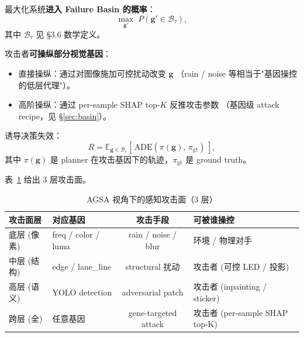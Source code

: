 \documentclass[a4paper,12pt,fontset=fandol]{ctexart}
\begin{document}
\begin{description}[leftmargin=1.4em,style=nextline]
\item[\textbf{敌手目标}（Adversary Goal）] 最大化系统\textbf{进入 Failure Basin 的概率}：
  \begin{equation*}
  \max_{\mathbf{g}'} \; P\!\left(\mathbf{g}' \in \mathcal{B}_{\tau}\right),
  \end{equation*}
  其中 $\mathcal{B}_{\tau}$ 见 §3.6 数学定义。

\item[\textbf{敌手能力}（Adversary Capability）] 攻击者\textbf{可操纵部分视觉基因}：
  \begin{itemize}[leftmargin=*]
  \item 直接操纵：通过对图像施加可控扰动改变 $\mathbf{g}$
    （rain / noise 等相当于"基因操控的低层代理"）。
  \item 高阶操纵：通过 per-sample SHAP top-$K$ 反推攻击参数
    （基因级 attack recipe，见 \S\ref{sec:basin}）。
  \end{itemize}

\item[\textbf{敌手收益}（Adversary Reward）] 诱导决策失效：
  \begin{equation*}
  R = \mathbb{E}_{\mathbf{g} \in \mathcal{B}_{\tau}} \left[\, \mathrm{ADE}\!\left(\pi(\mathbf{g}),\, \pi_{\text{gt}}\right) \,\right],
  \end{equation*}
  其中 $\pi(\mathbf{g})$ 是 planner 在攻击基因下的轨迹，$\pi_{\text{gt}}$ 是 ground truth。

\item[\textbf{攻击面层次}] 表~\ref{tab:attack_surface} 给出 3 层攻击面。
\end{description}

\begin{table}[H]
\centering
\small
\caption{AGSA 视角下的感知攻击面（3 层）}
\label{tab:attack_surface}
\begin{tabularx}{\linewidth}{lXcX}
\toprule
\textbf{攻击面层} & \textbf{对应基因} & \textbf{攻击手段} & \textbf{可被谁操控} \\
\midrule
底层 (像素) & freq / color / luma & rain / noise / blur & 环境 / 物理对手 \\
中层 (结构) & edge / lane\_line & structural 扰动 & 攻击者 (可控 LED / 投影)\\
高层 (语义) & YOLO detection & adversarial patch & 攻击者 (inpainting / sticker)\\
\midrule
跨层 (全) & 任意基因 & gene-targeted attack & 攻击者 (per-sample SHAP top-K)\\
\bottomrule
\end{tabularx}
\end{table}
\end{document}
